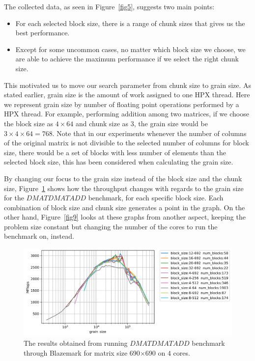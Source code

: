 The collected data, as seen in Figure~\ref{fig5}, suggests two main points:
\begin{itemize}
	\item For each selected block size, there is a range of chunk sizes that gives us the best performance. 
	\item Except for some uncommon cases, no matter which block size we choose, we are able to achieve the maximum performance if we select the right chunk size.  
\end{itemize}

This motivated us to move our search parameter from chunk size to grain size. As stated earlier, grain size is the amount of work assigned to one HPX thread. Here we represent grain size by number of floating point operations performed by a HPX thread. For example, performing addition among two matrices, if we choose the block size as $4\times64$ and chunk size as $3$, the grain size would be $3\times4\times64=768$. 
Note that in our experiments whenever the number of columns of the original matrix is not divisible to the selected number of columns for block size, there would be a set of blocks with less number of elements than the selected block size, this has been considered when calculating the grain size.  

By changing our focus to the grain size instead of the block size and the chunk size, Figure~\ref{fig6} shows how the throughput changes with regards to the grain size for the $DMATDMATADD$ benchmark, for each specific block size. Each combination of block size and chunk size generates a point in the graph. On the other hand, Figure~\ref{fig9} looks at these graphs from another aspect, keeping the problem size constant but changing the number of the cores to run the benchmark on, instead.

\begin{figure}[H]
	\centering\includegraphics[width=1\linewidth]{images/fig6.png}
	\caption{The results obtained from running $DMATDMATADD$ benchmark through Blazemark for matrix size 690$\times$690 on $4$ cores.}	
	\label{fig6}
\end{figure}

